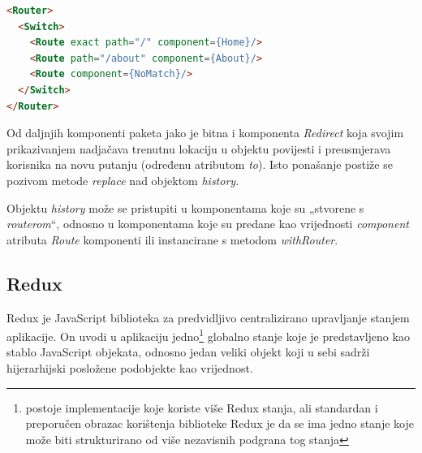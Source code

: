 \documentclass[times, utf8, diplomski, numeric]{fer}
\newcommand{\razmakp}{\vspace{18pt}}
\newcommand{\razmaks}{\vspace{10pt}}
\begin{document}
\razmakp %
\begin{lstlisting}[language=html, caption={Primjer korištenja \emph{Switch}komponente}, label={lst:react_router_switch}]
<Router>
  <Switch>
    <Route exact path="/" component={Home}/>
    <Route path="/about" component={About}/>
    <Route component={NoMatch}/>
  </Switch>
</Router>
\end{lstlisting}
\razmaks

Od daljnjih komponenti paketa jako je bitna i komponenta \emph{Redirect} koja svojim prikazivanjem nadjačava trenutnu lokaciju u objektu povijesti i preusmjerava korisnika na novu putanju (određenu atributom \emph{to}).
Isto ponašanje postiže se pozivom metode \emph{replace} nad objektom \emph{history}.

Objektu \emph{history} može se pristupiti u komponentama koje su „stvorene s \emph{routerom}“, odnosno u komponentama koje su predane kao vrijednosti \emph{component} atributa \emph{Route} komponenti ili instancirane s metodom \emph{withRouter}.


\razmaks
\subsection{Redux}

Redux je JavaScript biblioteka za predvidljivo centralizirano upravljanje stanjem aplikacije.
On uvodi u aplikaciju jedno\footnote{
    postoje implementacije koje koriste više Redux stanja, ali standardan i preporučen obrazac korištenja biblioteke Redux je da se ima jedno stanje koje može biti strukturirano od više nezavisnih podgrana tog stanja
} globalno stanje koje je predstavljeno kao stablo JavaScript objekata, odnosno jedan veliki objekt koji u sebi sadrži hijerarhijski posložene podobjekte kao vrijednost.
\end{document}
